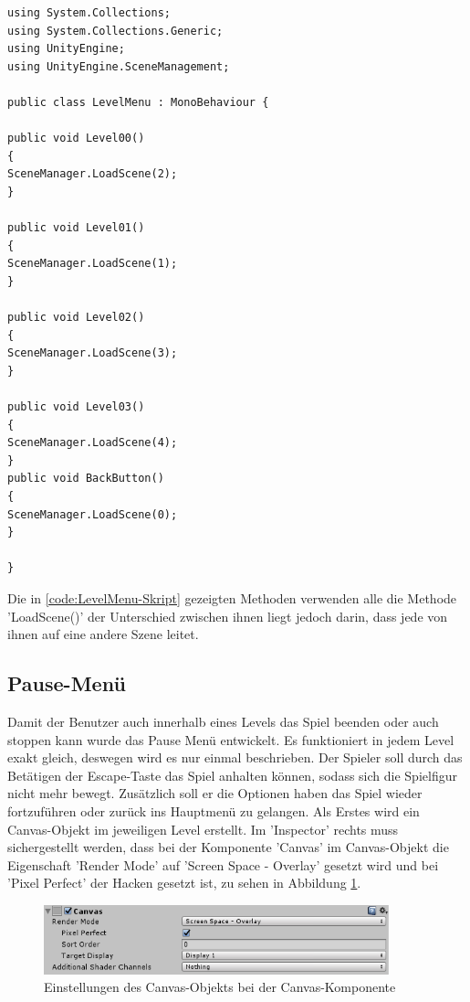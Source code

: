 \begin{lstlisting}[language={[Sharp]C}, caption=LevelMenu-Script, label=code:LevelMenu-Skript]
using System.Collections;
using System.Collections.Generic;
using UnityEngine;
using UnityEngine.SceneManagement;

public class LevelMenu : MonoBehaviour {

public void Level00()
{
SceneManager.LoadScene(2);
}

public void Level01()
{
SceneManager.LoadScene(1);
}

public void Level02()
{
SceneManager.LoadScene(3);
}

public void Level03()
{
SceneManager.LoadScene(4);
}
public void BackButton()
{
SceneManager.LoadScene(0);
}

}
\end{lstlisting}
Die in \cref{code:LevelMenu-Skript} gezeigten Methoden verwenden alle die Methode ’LoadScene()’ der Unterschied zwischen ihnen liegt jedoch darin, dass jede von ihnen auf eine andere Szene leitet.

\subsection{Pause-Menü}
Damit der Benutzer auch innerhalb eines Levels das Spiel beenden oder auch stoppen kann wurde das Pause Menü entwickelt. Es funktioniert in jedem Level exakt gleich, deswegen wird es nur einmal beschrieben.
Der Spieler soll durch das Betätigen der Escape-Taste das Spiel anhalten können, sodass sich die Spielfigur nicht mehr bewegt. Zusätzlich soll er die Optionen haben das Spiel wieder fortzuführen oder zurück ins Hauptmenü zu gelangen.
Als Erstes wird ein Canvas-Objekt im jeweiligen Level erstellt. Im ’Inspector’ rechts muss sichergestellt werden, dass bei der Komponente ’Canvas’ im Canvas-Objekt die Eigenschaft ’Render Mode’ auf ’Screen Space - Overlay’ gesetzt wird und bei ’Pixel Perfect’ der Hacken gesetzt ist, zu sehen in Abbildung \ref{CanvasPause}.


\begin{figure}[H]
	\includegraphics[width=10cm]{images/CanvasPause.png}
	\caption{Einstellungen des Canvas-Objekts bei der Canvas-Komponente}
	\label{CanvasPause}
\end{figure}

